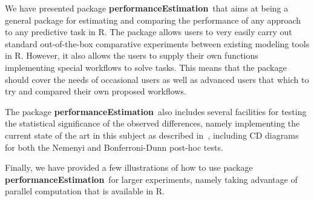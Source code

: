 \documentclass[10pt,a4paper]{article}\usepackage[]{graphicx}\usepackage[]{color}
\newcommand{\PE}{package \textbf{performanceEstimation}\ }
\begin{document}
We have presented \PE that aims at being a general package for estimating and comparing the performance of any approach to any predictive task in R. The package allows users to very easily carry out standard out-of-the-box comparative experiments between existing modeling tools in R. However, it also allows the users to supply their own functions implementing special workflows to solve tasks. This means that the package should cover the needs of occasional users as well as advanced users that which to try and compared their own proposed workflows.

The \PE also includes several facilities for testing the statistical significance of the observed differences, namely implementing the current state of the art in this subject as described in~\cite{Dem06}, including CD diagrams for both the Nemenyi and Bonferroni-Dunn post-hoc tests.

Finally, we have provided a few illustrations of how to use \PE for larger experiments, namely taking advantage of parallel computation that is available in R.



\end{document}
